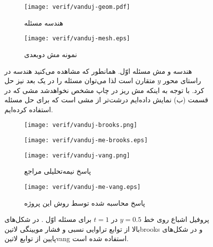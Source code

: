 \begin{figure}
\begin{subfigure}{0.5\textwidth}
\texttt{[image: verif/vanduj-geom.pdf]} 
\caption{هندسه مسئله}
\label{fig:4vandujprob-geo}
\end{subfigure}
\begin{subfigure}{0.5\textwidth}
\texttt{[image: verif/vanduj-mesh.eps]} 
\caption{نمونه مش دوبعدی}
\label{fig:4vandujprob-mesh}
\end{subfigure}
\caption[هندسه و مش مسئله اوّل]{هندسه و مش مسئله اوّل. همانطور که مشاهده می‌کنید هندسه در راستای محور $y$ متقارن است لذا می‌توان مسئله را در یک بعد نیز حل کرد. با توجه به اینکه مش ریز در چاپ مشخص نخواهد‌شد مشی که در قسمت (ب) نمایش داده‌ایم درشت‌تر از مشی است که برای حل مسئله استفاده کرده‌ایم.}
\label{fig:4vandujprob} \vspace{1cm}
\begin{subfigure}{0.5\textwidth}
\texttt{[image: verif/vanduj-brooks.png]} 
\end{subfigure}
\begin{subfigure}{0.5\textwidth}
\texttt{[image: verif/vanduj-me-brooks.eps]}
\end{subfigure}
\begin{subfigure}{0.5\textwidth}
\texttt{[image: verif/vanduj-vang.png]} 
\caption{پاسخ نیمه‌تحلیلی مراجع \cite{vandujanal,vandujthes}}
\label{fig:4vandujres-him}
\end{subfigure}
\begin{subfigure}{0.5\textwidth}
\texttt{[image: verif/vanduj-me-vang.eps]} 
\caption{پاسخ محاسبه شده توسط روش این پروژه}
\label{fig:4vandujres-me}
\end{subfigure}
\caption[پروفیل اشباع روی خط $y=0.5$ در $t=1$ برای مسئله اوّل]{پروفیل اشباع روی خط $y=0.5$ در $t=1$ برای مسئله اوّل . در شکل‌های بالا از توابع تراوایی نسبی و فشار مویینگی \text‌لاتین{brooks} و در شکل‌های پایین از توابع \text‌لاتین{vang} استفاده شده است.  }
\label{fig:4vandujres}
\end{figure}
